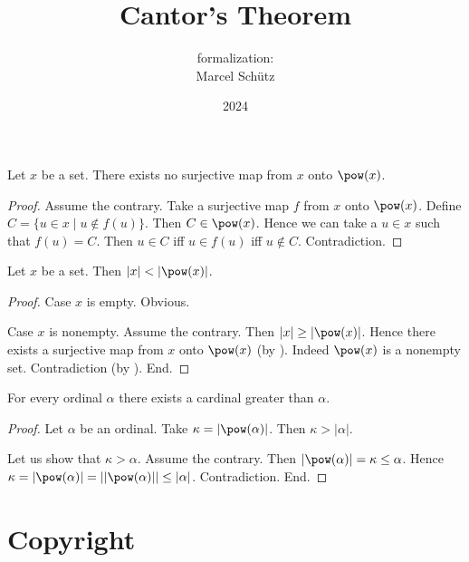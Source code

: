 \documentclass{article}
\title{Cantor's Theorem}
\author{\Naproche formalization: \vspace{0.5em} \\
Marcel Schütz}
\date{2024}
\begin{document}
  \maketitle


  \begin{forthel}
    \begin{theorem*}[title=Cantor's Theorem,id=cantor]
      Let $x$ be a set.
      There exists no surjective map from $x$ onto $\pow(x)$.
    \end{theorem*}
    \begin{proof}
      Assume the contrary.
      Take a surjective map $f$ from $x$ onto $\pow(x)$.
      Define $C = \{ u \in x \mid u \notin f(u) \}$.
      Then $C \in \pow(x)$.
      Hence we can take a $u \in x$ such that $f(u) = C$.
      Then $u \in C$ iff $u \in f(u)$ iff $u \notin C$.
      Contradiction.
    \end{proof}
  \end{forthel}

  \begin{forthel}
    \begin{corollary*}
      Let $x$ be a set.
      Then $|x| < |\pow(x)|$.
    \end{corollary*}
    \begin{proof}
      Case $x$ is empty. Obvious.

      Case $x$ is nonempty.
        Assume the contrary.
        Then $|x| \geq |\pow(x)|$.
        Hence there exists a surjective map from $x$ onto $\pow(x)$ (by ).
        Indeed $\pow(x)$ is a nonempty set.
        Contradiction (by ).
      End.
    \end{proof}
  \end{forthel}

  \begin{forthel}
    \begin{corollary*}
      For every ordinal $\alpha$ there exists a cardinal greater than $\alpha$.
    \end{corollary*}
    \begin{proof}
      Let $\alpha$ be an ordinal.
      Take $\kappa = |\pow(\alpha)|$.
      Then $\kappa > |\alpha|$.

      Let us show that $\kappa > \alpha$.
        Assume the contrary.
        Then $|\pow(\alpha)|
          = \kappa
          \leq \alpha$.
        Hence $\kappa
          = |\pow(\alpha)|
          = ||\pow(\alpha)||
          \leq |\alpha|$.
        Contradiction.
      End.
    \end{proof}
  \end{forthel}

  \section*{Copyright}
  \doclicenseThis
\end{document}
